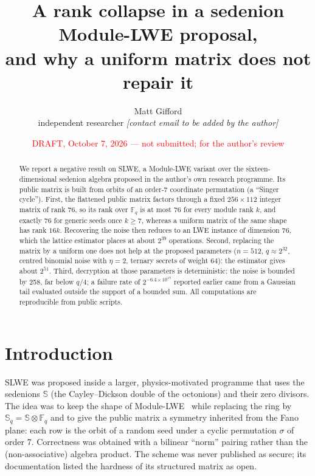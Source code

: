 \documentclass[11pt]{article}
\title{A rank collapse in a sedenion Module-LWE proposal,\\ and why a uniform matrix does not repair it}
\author{Matt Gifford\\ \small independent researcher \quad \textit{[contact email to be added by the author]}}
\date{\small \textcolor{red}{DRAFT, October 7, 2026 --- not submitted; for the author's review}}
\theoremstyle{remark}
\newcommand{\F}{\mathbb{F}}
\newcommand{\Sed}{\mathbb{S}}
\begin{document}
\maketitle

\begin{abstract}
We report a negative result on SLWE, a Module-LWE variant over the sixteen-dimensional sedenion algebra proposed in the
author's own research programme. Its public matrix is built from orbits of an order-7 coordinate permutation (a
``Singer cycle''). First, the flattened public matrix factors through a fixed $256\times112$ integer matrix of rank 76,
so its rank over $\F_q$ is at most 76 for every module rank $k$, and exactly 76 for generic seeds once $k\ge 7$, whereas a
uniform matrix of the same shape has rank $16k$. Recovering the noise then reduces to an LWE instance of dimension 76,
which the lattice estimator places at about $2^{39}$ operations. Second, replacing the matrix by a uniform one does not
help at the proposed parameters ($n=512$, $q\approx2^{32}$, centred binomial noise with $\eta=2$, ternary secrets of
weight 64): the estimator gives about $2^{51}$. Third, decryption at those parameters is deterministic: the noise is
bounded by 258, far below $q/4$; a failure rate of $2^{-6.4\times10^{15}}$ reported earlier came from a Gaussian tail
evaluated outside the support of a bounded sum. All computations are reproducible from public scripts.
\end{abstract}

\section{Introduction}

SLWE was proposed inside a larger, physics-motivated programme that uses the sedenions $\Sed$ (the Cayley--Dickson
double of the octonions) and their zero divisors. The idea was to keep the shape of Module-LWE~\cite{Regev,LS15} while replacing the ring by
$\Sed_q=\Sed\otimes\F_q$ and to give the public matrix a symmetry inherited from the Fano plane: each row is the orbit of
a random seed under a cyclic permutation $\sigma$ of order 7. Correctness was obtained with a bilinear ``norm'' pairing
rather than the (non-associative) algebra product. The scheme was never published as secure; its documentation listed
the hardness of its structured matrix as open.
\end{document}
